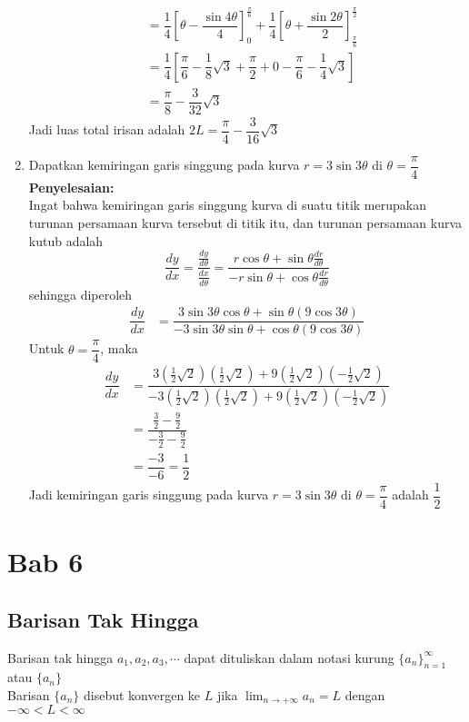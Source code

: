 \documentclass{article}
\begin{document}
\begin{enumerate}
\begin{align*}
	&= \dfrac{1}{4}\left[\theta -\dfrac{\sin 4\theta}{4}\right]_0^\frac{\pi}{6} + \dfrac{1}{4}\left[\theta+\dfrac{\sin 2\theta}{2}\right]_\frac{\pi}{6}^\frac{\pi}{2}\\
	&= \dfrac{1}{4}\left[\dfrac{\pi}{6}-\dfrac{1}{8}\sqrt{3}+\dfrac{\pi}{2}+0-\dfrac{\pi}{6}-\dfrac{1}{4}\sqrt{3}\right]\\
	&= \dfrac{\pi}{8}-\dfrac{3}{32}\sqrt{3}
	\end{align*}
	Jadi luas total irisan adalah $2L=\dfrac{\pi}{4}-\dfrac{3}{16}\sqrt{3}$
	\item Dapatkan kemiringan garis singgung pada kurva $r=3\sin 3\theta$ di $\theta=\dfrac{\pi}{4}$\\
	\textbf{Penyelesaian:}\\
	Ingat bahwa kemiringan garis singgung kurva di suatu titik merupakan turunan persamaan kurva tersebut di titik itu, dan turunan persamaan kurva kutub adalah
	$$ \dfrac{dy}{dx} = \dfrac{\frac{dy}{d\theta}}{\frac{dx}{d\theta}} = \dfrac{r\cos\theta +\sin\theta \frac{dr}{d\theta}}{-r\sin\theta+\cos\theta \frac{dr}{d\theta}} $$
	sehingga diperoleh 
	\begin{align*}
	\dfrac{dy}{dx} &= \dfrac{3\sin 3\theta \cos \theta+\sin \theta (9\cos 3\theta)}{-3\sin 3\theta\sin\theta +\cos\theta (9\cos 3\theta)}
	\end{align*}
	Untuk $\theta=\dfrac{\pi}{4}$, maka 
	\begin{align*}
	\dfrac{dy}{dx} &= \dfrac{3\left( \frac{1}{2}\sqrt{2}\right)\left( \frac{1}{2}\sqrt{2}\right)+9\left( \frac{1}{2}\sqrt{2}\right) \left(-\frac{1}{2}\sqrt{2}\right)}{-3\left(\frac{1}{2}\sqrt{2}\right)\left(\frac{1}{2}\sqrt{2}\right)+9\left(\frac{1}{2}\sqrt{2}\right)\left(-\frac{1}{2}\sqrt{2}\right)}\\
	&= \dfrac{\frac{3}{2}-\frac{9}{2}}{-\frac{3}{2}-\frac{9}{2}}\\
	&= \dfrac{-3}{-6} = \dfrac{1}{2}
	\end{align*}
	Jadi kemiringan garis singgung pada kurva $r=3\sin 3\theta$ di $\theta=\dfrac{\pi}{4}$ adalah $\dfrac{1}{2}$
\end{enumerate}
\newpage
\section{Bab 6}
\subsection{Barisan Tak Hingga}
Barisan tak hingga $a_1,a_2,a_3,\cdots$ dapat dituliskan dalam notasi kurung $\{a_n\}_{n=1}^\infty$ atau $\{a_n\}$\\
Barisan $\{a_n\}$ disebut konvergen ke $L$ jika $\displaystyle \lim_{n\rightarrow +\infty} a_n = L$ dengan $-\infty<L<\infty$
\end{document}
